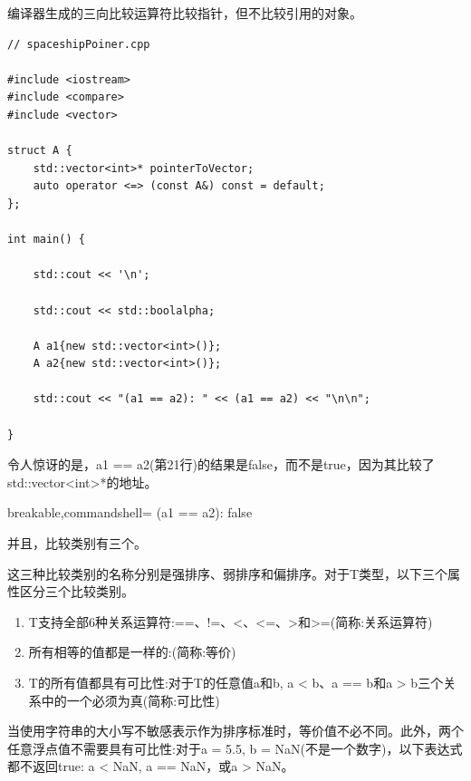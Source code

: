 \begin{tcolorbox}[breakable,enhanced jigsaw,colback=red!5!white,colframe=red!75!black,title={指针比较}]

编译器生成的三向比较运算符比较指针，但不比较引用的对象。

\begin{lstlisting}[style=styleCXX]
// spaceshipPoiner.cpp

#include <iostream>
#include <compare>
#include <vector>

struct A {
	std::vector<int>* pointerToVector;
	auto operator <=> (const A&) const = default;
};

int main() {

	std::cout << '\n';
	
	std::cout << std::boolalpha;
	
	A a1{new std::vector<int>()};
	A a2{new std::vector<int>()};
	
	std::cout << "(a1 == a2): " << (a1 == a2) << "\n\n";

}
\end{lstlisting}

令人惊讶的是，a1 == a2(第21行)的结果是false，而不是true，因为其比较了std::vector<int>*的地址。

\begin{tcblisting}{breakable,commandshell={}}
(a1 == a2): false
\end{tcblisting}

\end{tcolorbox}

并且，比较类别有三个。


这三种比较类别的名称分别是强排序、弱排序和偏排序。对于T类型，以下三个属性区分三个比较类别。

\begin{enumerate}
\item 
T支持全部6种关系运算符:==、!=、<、<=、>和>=(简称:关系运算符)

\item 
所有相等的值都是一样的:(简称:等价)

\item 
T的所有值都具有可比性:对于T的任意值a和b, a < b、a == b和a > b三个关系中的一个必须为真(简称:可比性)
\end{enumerate}

当使用字符串的大小写不敏感表示作为排序标准时，等价值不必不同。此外，两个任意浮点值不需要具有可比性:对于a = 5.5, b = NaN(不是一个数字)，以下表达式都不返回true: a < NaN, a == NaN，或a > NaN。

